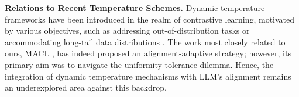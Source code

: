 \textbf{Relations to Recent Temperature Schemes.}
Dynamic temperature frameworks have been introduced in the realm of contrastive learning, motivated by various objectives, such as addressing out-of-distribution tasks \cite{Uncertainty} or accommodating long-tail data distributions \cite{long_tail}. The work most closely related to ours, MACL \cite{MACL}, has indeed proposed an alignment-adaptive strategy; however, its primary aim was to navigate the uniformity-tolerance dilemma. Hence, the integration of dynamic temperature mechanisms with LLM's alignment remains an underexplored area against this backdrop.